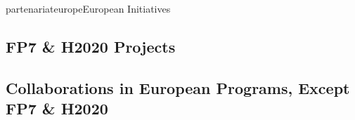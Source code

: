\documentclass{ra2018}
\begin{document}

\begin{module}{partenariat}{europe}{European Initiatives}

\subsection{FP7 \& H2020 Projects}


%




\subsection{Collaborations in European Programs, Except FP7 \& H2020}




\end{module}
\end{document}
